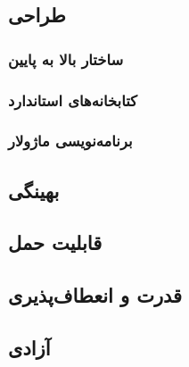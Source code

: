 \subsection{طراحی}
\subsubsection{ساختار بالا به پایین}
\subsubsection{کتابخانه‌های استاندارد}
\subsubsection{برنامه‌نویسی ماژولار}
\subsection{بهینگی}
\subsection{قابلیت حمل}
\subsection{قدرت و انعطاف‌پذیری}
\subsection{آزادی}

